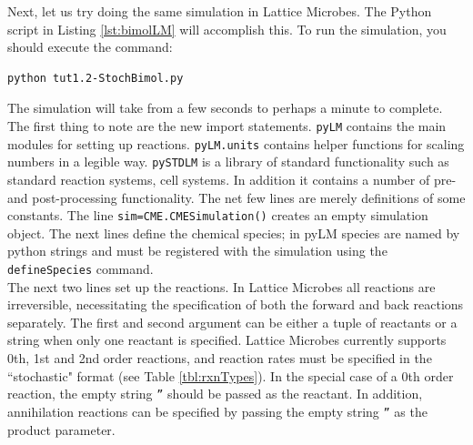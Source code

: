 Next, let us try doing the same simulation in Lattice Microbes.  The Python script in Listing \ref{lst:bimolLM} will accomplish this. To run the simulation, you should execute the command: 

\begin{verbatim}
python tut1.2-StochBimol.py
\end{verbatim}

The simulation will take from a few seconds to perhaps a minute to complete.\\

The first thing to note are the new import statements.  \texttt{pyLM} contains the main modules for setting up reactions.  \texttt{pyLM.units} contains helper functions for scaling numbers in a legible way.  \texttt{pySTDLM} is a library of standard functionality such as standard reaction systems, cell systems.  In addition it contains a number of pre- and post-processing functionality.  The net few lines are merely definitions of some constants.  The line \texttt{sim=CME.CMESimulation()} creates an empty simulation object. The next lines define the chemical species; in pyLM species are named by python strings and must be registered with the simulation using the \texttt{defineSpecies} command.  \\

The next two lines set up the reactions.  In Lattice Microbes all reactions are irreversible, necessitating the specification of both the forward and back reactions separately.  The first and second argument can be either a tuple of reactants or a string when only one reactant is specified.  Lattice Microbes currently supports 0th, 1st and 2nd order reactions, and reaction rates must be specified in the ``stochastic" format (see Table \ref{tbl:rxnTypes}). In the special case of a 0th order reaction, the empty string \texttt{''} should be passed as the reactant.  In addition, annihilation reactions can be specified by passing the empty string \texttt{''} as the product parameter.  \\


